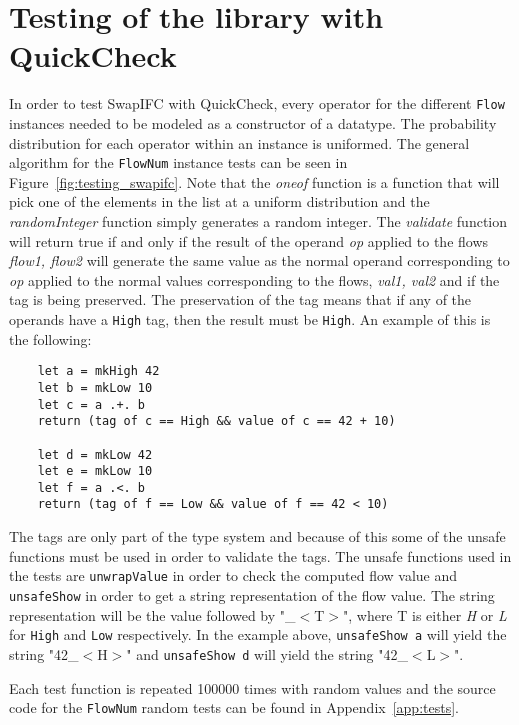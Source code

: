 \section{Testing of the library with QuickCheck}
In order to test SwapIFC with QuickCheck, every operator for the different {\tt Flow} instances needed to be modeled as a constructor of a datatype. The probability distribution for each operator within an instance is uniformed. The general algorithm for the {\tt FlowNum} instance tests can be seen in Figure~\ref{fig:testing_swapifc}. Note that the \emph{oneof} function is a function that will pick one of the elements in the list at a uniform distribution and the \emph{randomInteger} function simply generates a random integer. The \emph{validate} function will return true if and only if the result of the operand \emph{op} applied to the flows \emph{flow1, flow2} will generate the same value as the normal operand corresponding to \emph{op} applied to the normal values corresponding to the flows, \emph{val1, val2} and if the tag is being preserved. The preservation of the tag means that if any of the operands have a {\tt High} tag, then the result must be {\tt High}. An example of this is the following:
\begin{verbatim}
    let a = mkHigh 42
    let b = mkLow 10
    let c = a .+. b
    return (tag of c == High && value of c == 42 + 10)

    let d = mkLow 42
    let e = mkLow 10
    let f = a .<. b
    return (tag of f == Low && value of f == 42 < 10)
\end{verbatim}

The tags are only part of the type system and because of this some of the unsafe functions must be used in order to validate the tags. The unsafe functions used in the tests are {\tt unwrapValue} in order to check the computed flow value and {\tt unsafeShow} in order to get a string representation of the flow value. The string representation will be the value followed by "\_$<$T$>$", where T is either \emph{H} or \emph{L} for {\tt High} and {\tt Low} respectively. In the example above, {\tt unsafeShow a} will yield the string "42\_$<$H$>$" and {\tt unsafeShow d} will yield the string "42\_$<$L$>$".

Each test function is repeated 100000 times with random values and the source code for the {\tt FlowNum} random tests can be found in Appendix~\ref{app:tests}.

